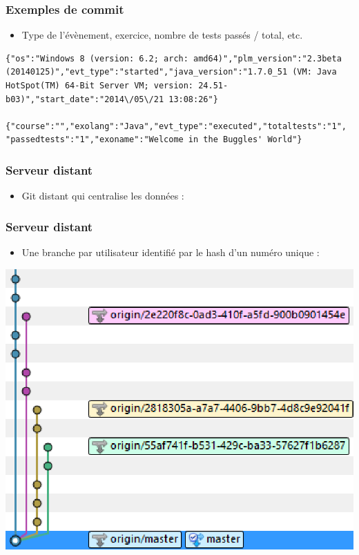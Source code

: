\begin{frame}[containsverbatim]
	\frametitle{Exemples de commit}
	\begin{itemize}
		\item Type de l'évènement, exercice, nombre de tests passés / total, etc.
	\end{itemize}
		\begin{lstlisting}[language = plm,basicstyle={\scriptsize\ttfamily}, caption= Message de commit]
{"os":"Windows 8 (version: 6.2; arch: amd64)","plm_version":"2.3beta (20140125)","evt_type":"started","java_version":"1.7.0_51 (VM: Java HotSpot(TM) 64-Bit Server VM; version: 24.51-b03)","start_date":"2014\/05\/21 13:08:26"}

{"course":"","exolang":"Java","evt_type":"executed","totaltests":"1", "passedtests":"1","exoname":"Welcome in the Buggles' World"}
		\end{lstlisting}
\end{frame}


\begin{frame}
	\frametitle{Serveur distant}
	\begin{itemize}
	\item Git distant qui centralise les données :
	\end{itemize}
	\begin{center}
		
	\end{center}
\end{frame}

\begin{frame}
	\frametitle{Serveur distant}
	\begin{itemize}
	\item Une branche par utilisateur identifié par le hash d'un numéro unique :
	\end{itemize}
	\begin{center}
		\includegraphics[scale=0.5]{images/tree.eps}
	\end{center}
\end{frame}

